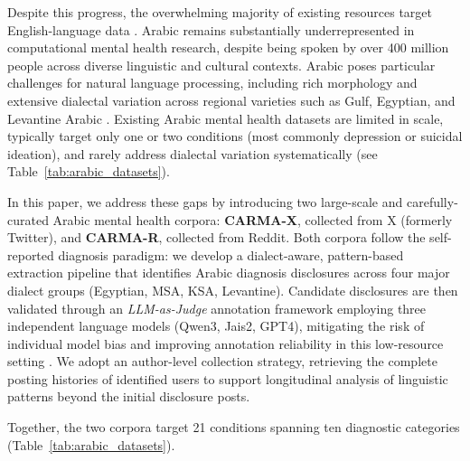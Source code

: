 \documentclass[11pt]{article}
\begin{document}
Despite this progress, the overwhelming majority of existing resources target English-language data \cite{harrigian2021state}. Arabic remains substantially underrepresented in computational mental health research, despite being spoken by over 400 million people across diverse linguistic and cultural contexts. Arabic poses particular challenges for natural language processing, including rich morphology and extensive dialectal variation across regional varieties such as Gulf, Egyptian, and Levantine Arabic \cite{darwish2021panorama,habash2010introduction}. Existing Arabic mental health datasets are limited in scale, typically target only one or two conditions (most commonly depression or suicidal ideation), and rarely address dialectal variation systematically (see Table~\ref{tab:arabic_datasets}).

In this paper, we address these gaps by introducing two large-scale and carefully-curated Arabic mental
health corpora: \textbf{CARMA-X}, collected from X (formerly Twitter), and
\textbf{CARMA-R}, collected from Reddit. Both corpora follow the self-reported
diagnosis paradigm: we develop a dialect-aware, pattern-based extraction pipeline
that identifies Arabic diagnosis disclosures across four major dialect groups (Egyptian, MSA, KSA, Levantine).
Candidate disclosures are then validated through an \textit{LLM-as-Judge}
annotation framework \cite{zheng2023judging} employing three independent language
models (Qwen3, Jais2, GPT4), mitigating the risk of individual model bias and improving annotation
reliability in this low-resource setting \cite{fu-liu-2025-reliable}. We adopt
an author-level collection strategy, retrieving the complete posting histories of
identified users to support longitudinal analysis of linguistic patterns beyond
the initial disclosure posts.

Together, the two corpora target 21 conditions spanning ten diagnostic
categories (Table~\ref{tab:arabic_datasets}).

\end{document}
